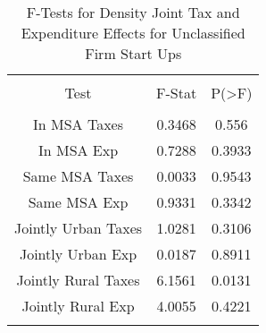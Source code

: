 
\begin{table}[!htbp] \centering 
  \caption{F-Tests for Density Joint Tax and Expenditure Effects for Unclassified Firm Start Ups} 
  \label{99Ftests} 
\begin{tabular}{@{\extracolsep{5pt}} ccc} 
\\[-1.8ex]\hline 
\hline \\[-1.8ex] 
Test & F-Stat & P(\textgreater F) \\ 
\hline \\[-1.8ex] 
In MSA Taxes & 0.3468 & 0.556 \\ 
In MSA Exp & 0.7288 & 0.3933 \\ 
Same MSA Taxes & 0.0033 & 0.9543 \\ 
Same MSA Exp & 0.9331 & 0.3342 \\ 
Jointly Urban Taxes & 1.0281 & 0.3106 \\ 
Jointly Urban Exp & 0.0187 & 0.8911 \\ 
Jointly Rural Taxes & 6.1561 & 0.0131 \\ 
Jointly Rural Exp & 4.0055 & 0.4221 \\ 
\hline \\[-1.8ex] 
\end{tabular} 
\end{table} 
